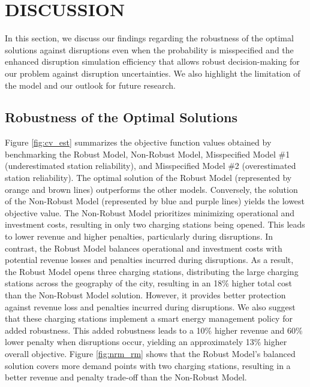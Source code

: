\documentclass[preprint]{oscmjournal}
\theoremstyle{remark}
\begin{document}
\section{DISCUSSION}
\label{sec:discussion}

In this section, we discuss our findings regarding the robustness of the optimal solutions against disruptions even when the probability is misspecified and the enhanced disruption simulation efficiency that allows robust decision-making for our problem against disruption uncertainties. We also highlight the limitation of the model and our outlook for future research.

\subsection{Robustness of the Optimal Solutions}


Figure \ref{fig:cv_est} summarizes the objective function values obtained by benchmarking the Robust Model, Non-Robust Model, Misspecified Model \#1 (underestimated station reliability), and Misspecified Model \#2 (overestimated station reliability). The optimal solution of the Robust Model (represented by orange and brown lines) outperforms the other models. Conversely, the solution of the Non-Robust Model (represented by blue and purple lines) yields the lowest objective value. The Non-Robust Model prioritizes minimizing operational and investment costs, resulting in only two charging stations being opened. This leads to lower revenue and higher penalties, particularly during disruptions. In contrast, the Robust Model balances operational and investment costs with potential revenue losses and penalties incurred during disruptions. As a result, the Robust Model opens three charging stations, distributing the large charging stations across the geography of the city, resulting in an 18\% higher total cost than the Non-Robust Model solution. However, it provides better protection against revenue loss and penalties incurred during disruptions. We also suggest that these charging stations implement a smart energy management policy \autocite{li2020energy} for added robustness. This added robustness leads to a 10\% higher revenue and 60\% lower penalty when disruptions occur, yielding an approximately 13\% higher overall objective. Figure \ref{fig:nrm_rm} shows that the Robust Model's balanced solution covers more demand points with two charging stations, resulting in a better revenue and penalty trade-off than the Non-Robust Model.
\end{document}
